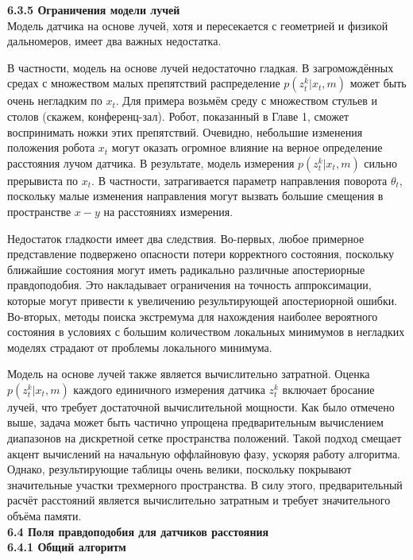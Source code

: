 \documentclass[10pt,a4paper]{article}
\begin{document}
\textbf{6.3.5 Ограничения модели лучей}\\

Модель датчика на основе лучей, хотя и пересекается  с геометрией и физикой дальномеров, имеет два важных недостатка.

В частности, модель на основе лучей  недостаточно гладкая. В загромождённых средах с множеством малых препятствий распределение $p(z_t^k | x_t, m)$ может быть очень негладким по $x_t$. Для примера возьмём среду с множеством стульев и столов (скажем,  конференц-зал). Робот, показанный в Главе 1, сможет воспринимать ножки этих препятствий. Очевидно, небольшие изменения положения робота $x_t$ могут оказать огромное влияние на верное определение расстояния лучом датчика. В результате, модель измерения $p(z_t^k | x_t, m)$ сильно прерывиста по $x_t$. В частности, затрагивается параметр направления поворота $\theta_t$, поскольку малые изменения направления могут вызвать большие смещения в пространстве  $x-y$ на расстояниях измерения.

Недостаток гладкости имеет два следствия. Во-первых, любое примерное представление подвержено опасности потери корректного состояния, поскольку ближайшие состояния могут иметь радикально различные апостериорные правдоподобия. Это накладывает ограничения на точность аппроксимации, которые могут привести к увеличению результирующей апостериорной ошибки. Во-вторых, методы поиска экстремума для нахождения наиболее вероятного состояния в условиях с большим количеством локальных минимумов в негладких моделях страдают от проблемы локального минимума. 

Модель на основе лучей также является вычислительно затратной. Оценка $p(z_t^k | x_t, m)$ каждого единичного измерения датчика $z_t^k$ включает бросание лучей, что требует достаточной вычислительной мощности. Как было отмечено выше, задача может быть частично упрощена предварительным вычислением диапазонов на дискретной сетке пространства положений.
Такой подход смещает акцент вычислений на начальную оффлайновую фазу, ускоряя работу алгоритма. Однако, результирующие таблицы очень велики, поскольку покрывают значительные участки трехмерного пространства. В силу этого, предварительный расчёт расстояний является вычислительно затратным и требует значительного объёма памяти.\\

\textbf{6.4 Поля правдоподобия для датчиков расстояния}\\

\textbf{6.4.1 Общий алгоритм}\\
\end{document}

